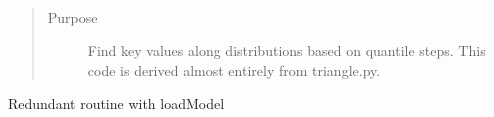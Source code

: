 \documentclass[letterpaper,10pt,english]{sphinxmanual}
\begin{document}

\begin{fulllineitems}
\label{splat_model:splat_model.distributionStats}~\begin{quote}\begin{description}
\item[{Purpose}] \leavevmode
Find key values along distributions based on quantile steps.
This code is derived almost entirely from triangle.py.

\end{description}\end{quote}

\end{fulllineitems}


\begin{fulllineitems}
\label{splat_model:splat_model.getModel}
Redundant routine with loadModel

\end{fulllineitems}

\end{document}
